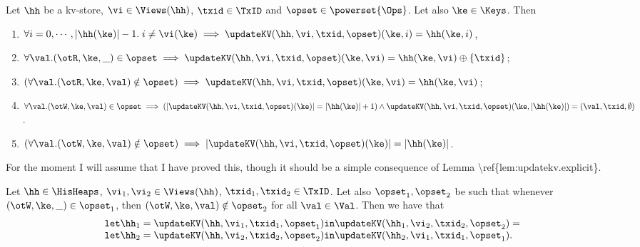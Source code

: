 \begin{corollary}
\label{cor:updatekv.singlecell}
Let $\hh$ be a kv-store, $\vi \in \Views(\hh)$, $\txid \in \TxID$ and $\opset \in \powerset{\Ops}$. 
Let also $\ke \in \Keys$. Then 
\begin{enumerate}
\item\label{item:updatekv.singlecell.noview} $\forall i=0,\cdots, \lvert \hh(\ke) \rvert -1.\; i \neq \vi(\ke) \implies \updateKV(\hh, \vi, \txid, \opset)(\ke, i) = 
\hh(\ke, i)$, 
\item\label{item:updatekv.singlecell.rd} $\forall \val. (\otR, \ke, \_) \in \opset \implies \updateKV(\hh,\vi,\txid, \opset)(\ke, \vi) = \hh(\ke, \vi) \oplus \{\txid\}$; 
\item\label{item:updatekv.singlecell.nord} $(\forall \val.(\otR,\ke, \val) \notin \opset) \implies \updateKV(\hh,\vi,\txid, \opset)(\ke,\vi) = \hh(\ke, \vi)$;
\item\label{item:updatekv.singlecell.wr} $\forall \val.(\otW, \ke, \val) \in \opset \implies (\lvert \updateKV(\hh,\vi,\txid,\opset)(\ke) \rvert = 
\lvert \hh(\ke) \rvert + 1) \wedge \updateKV(\hh,\vi,\txid,\opset)(\ke, \lvert \hh(\ke) \rvert) = (\val, \txid, \emptyset)$.
\item\label{item:updatekv.singlecell.nowr} $(\forall \val.(\otW, \ke, \val) \notin \opset) \implies \lvert \updateKV(\hh,\vi,\txid,\opset)(\ke) \rvert = \lvert \hh(\ke) \rvert$.
\end{enumerate}
\end{corollary}
\ac{For the moment I will assume that I have proved this, though it should be a simple consequence of Lemma 
\ref{lem:updatekv.explicit}.}

\begin{proposition}
Let $\hh \in \HisHeaps$, $\vi_1, \vi_2 \in \Views(\hh)$, 
$\txid_1, \txid_2 \in \TxID$. 
Let also $\opset_1, \opset_2$ be such that whenever 
$(\otW, \ke, \_) \in \opset_1$, then $(\otW, \ke, \val) \notin \opset_2$ 
for all $\val \in \Val$. Then we have that
\[
\begin{array}{l}
\mathtt{let } \hh_1 = \updateKV(\hh, \vi_1, \txid_1, \opset_1) \mathtt{ in } \updateKV(\hh_1, \vi_2, \txid_2, \opset_2) = \\
\mathtt{let } \hh_2 = \updateKV(\hh, \vi_2, \txid_2, \opset_2) \mathtt{ in } \updateKV(\hh_2, \vi_1, \txid_1, \opset_1).
\end{array}
\]
\end{proposition}

